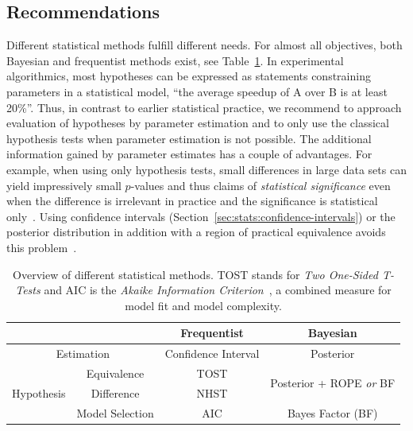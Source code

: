 \documentclass[algorithms,article,submit,moreauthors,pdftex]{Definitions/mdpi}
\begin{document}
\subsection{Recommendations}
\label{sec:stats:recommendations}
%
Different statistical methods fulfill different needs.
For almost all objectives, both Bayesian and frequentist methods exist, see Table~\ref{table:stats-methods}.
In experimental algorithmics, most hypotheses can be expressed as statements constraining parameters in a statistical model, \ie ``the average speedup of A over B is at least 20\%''.
Thus, in contrast to earlier statistical practice, we recommend to approach evaluation of hypotheses by parameter estimation and to only use the classical hypothesis tests when parameter estimation is not possible.
The additional information gained by parameter estimates has a couple of advantages.
For example, when using only hypothesis tests, small differences in large data sets can yield impressively small $p$-values and thus claims of \emph{statistical significance} even when the difference is irrelevant in practice and the significance is statistical only~\cite{Coffin00}.
Using confidence intervals (Section~\ref{sec:stats:confidence-intervals}) or the posterior distribution in addition with a region of practical equivalence avoids this problem~\cite{kruschke2018bayesian}.

\begin{table}
\centering
\begin{tabular}{cccc}
 & & Frequentist & Bayesian\\
 \toprule
 \multicolumn{2}{c}{Estimation} & Confidence Interval & Posterior\\
 \midrule
 \multirow{3}{*}{Hypothesis} & Equivalence & TOST & \multirow{2}{*}{Posterior + ROPE \emph{or} BF} \\
 \cline{2-3}
 & Difference & NHST &\\
 \cline{2-4}
 & Model Selection & AIC & Bayes Factor (BF)\\
\end{tabular}
\caption{Overview of different statistical methods.
 TOST stands for \emph{Two One-Sided T-Tests} and AIC is the \emph{Akaike Information Criterion}~\cite{akaike1974statistical}, a combined measure for model fit and model complexity.
 }
\label{table:stats-methods}
\end{table}
\end{document}
